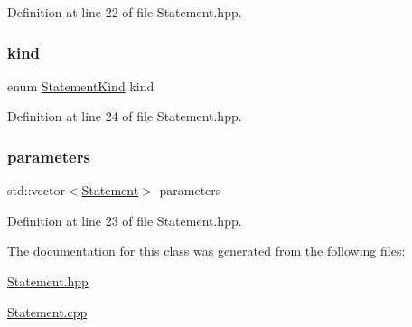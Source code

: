 Definition at line 22 of file Statement.\+hpp.

\mbox{\label{classft_1_1_statement_ad4e117b2f59a58b0f0091c8fa8bbcb55}} 
\subsubsection{\texorpdfstring{kind}{kind}}
{\footnotesize\ttfamily enum \hyperlink{namespaceft_a1cc6ed80039d68c038ae5982fb6b2ca4}{Statement\+Kind} kind}



Definition at line 24 of file Statement.\+hpp.

\mbox{\label{classft_1_1_statement_aa3968f0789a0c0354fd565636082d043}} 
\subsubsection{\texorpdfstring{parameters}{parameters}}
{\footnotesize\ttfamily std\+::vector$<$\hyperlink{classft_1_1_statement}{Statement}$>$ parameters}



Definition at line 23 of file Statement.\+hpp.



The documentation for this class was generated from the following files\+:\begin{DoxyCompactItemize}
\item 
\hyperlink{_statement_8hpp}{Statement.\+hpp}\item 
\hyperlink{_statement_8cpp}{Statement.\+cpp}\end{DoxyCompactItemize}
